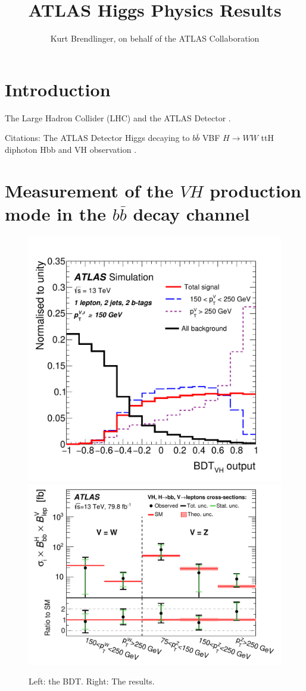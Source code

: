 \documentclass{moriond}
\begin{document}
\linenumbers

\vspace*{4cm}
\title{ATLAS Higgs Physics Results}

\author{ Kurt Brendlinger, on behalf of the ATLAS Collaboration }

\address{~\\DESY, Notkestra\ss e 85,\\ 22607 Hamburg, Germany}

\maketitle{}

\section{Introduction}

The Large Hadron Collider (LHC) \cite{Evans:2008zzb} and the ATLAS Detector \cite{PERF-2007-01}.

Citations:
The ATLAS Detector \cite{PERF-2007-01}
Higgs decaying to $b\bar b$ \cite{HIGG-2018-50}
VBF $H{\rightarrow}WW$ \cite{HIGG-2017-14}
ttH diphoton \cite{ATLAS-CONF-2019-004}
Hbb and VH observation \cite{HIGG-2018-04}.

\section{Measurement of the $VH$ production mode in the $b\bar b$ decay channel}\label{sec:vh_bb}

\begin{figure}[!htbp]
\centering
\includegraphics[width=0.425\linewidth]{figures/HIGG-2018-50/fig_01_v1.pdf}
\includegraphics[width=0.565\linewidth]{figures/HIGG-2018-50/fig_03.pdf}
\caption{
  Left: the BDT. Right: The results.
}
\label{fig:vh_bb}
\end{figure}
\end{document}
